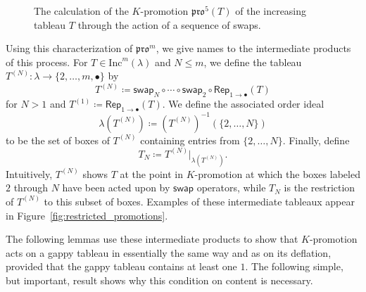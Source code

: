 \documentclass[12pt]{amsart}
\theoremstyle{definition}
\theoremstyle{remark}
\numberwithin{equation}{section}
\newcommand{\inc}{\ensuremath{\mathrm{Inc}}}
\newcommand{\pro}{\mathfrak{pro}}
\newcommand{\swap}{\ensuremath{\mathsf{swap}}}
\newcommand{\decr}{\ensuremath{\mathsf{Decr}}}
\newcommand{\rep}{\ensuremath{\mathsf{Rep}}}
\begin{document}
 \begin{figure}[h]
\caption{The calculation of the $K$-promotion $\pro^{5}(T)$ of the increasing tableau $T$ through the action of a sequence of swaps.}\label{fig:promotion_via_swaps}
 \end{figure}

Using this characterization of $\pro^m$, we give names to the intermediate products of this process.
For $T \in \inc^m(\lambda)$ and $N \leq m$, we define the tableau $T^{(N)}: \lambda \rightarrow \lbrace 2, \dots, m, \bullet \rbrace$ by 
\[T^{(N)} \coloneqq \swap_N \circ \cdots \circ \swap_2 \circ \rep_{1 \rightarrow \bullet}(T)\] for $N > 1$ and $T^{(1)} \coloneqq \rep_{1 \rightarrow \bullet}(T)$. We define the associated order ideal 
\[
\lambda \left( T^{(N)} \right) \coloneqq \left( T^{(N)} \right)^{-1}(\{2,\dots,N\})
\]
 to be the set of boxes of $T^{(N)}$ containing entries from $\{2,\dots,N\}$. Finally, define 
 \[
 T_N \coloneqq T^{(N)} \vert_{\lambda \left( T^{(N)} \right) }.
 \]
  Intuitively, $T^{(N)}$ shows $T$ at the point in $K$-promotion at which the boxes labeled $2$ through $N$ have been acted upon by $\swap$ operators, while $T_N$ is the restriction of $T^{(N)}$ to this subset of boxes. Examples of these intermediate tableaux appear in Figure~\ref{fig:restricted_promotions}. 
  
  The following lemmas use these intermediate products to show that $K$-promotion acts on a gappy tableau in essentially the same way and as on its deflation, provided that the gappy tableau contains at least one $1$. The following simple, but important, result shows why this condition on content is necessary.
\end{document}

